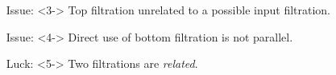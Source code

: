 \begin{frame}
\begin{figure}
\begin{minipage}{.2\textwidth}
\begin{tikzpicture}[y=1.0pt, x=0.8pt, yscale=-1, scale=.5]
\end{tikzpicture}
\vspace*{1cm}
\end{minipage}
\begin{minipage}[t]{.4\textwidth}
\blowupcomplex
\end{minipage}
\end{figure}
\vspace{-1cm}
\begin{itemize}
\item[Issue:]<3-> Top filtration unrelated to a possible input filtration.
\item[Issue:]<4-> Direct use of bottom filtration is not parallel.
\item[Luck:]<5->  Two filtrations are \emph{related}.
\end{itemize}
\end{frame}

